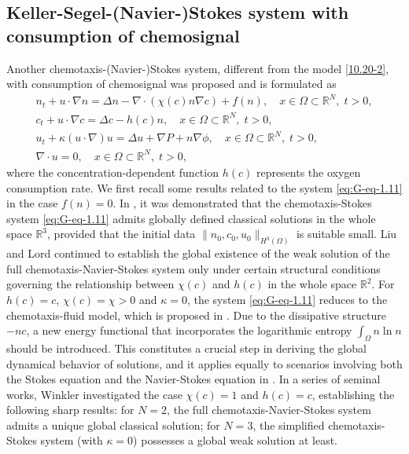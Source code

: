 \documentclass[10pt,a4paper]{amsart}
\numberwithin{equation}{section}
\begin{document}
\subsection*{Keller-Segel-(Navier-)Stokes system with consumption of chemosignal} 
Another chemotaxis-(Navier-)Stokes system, different from the model \eqref{10.20-2}, 
with consumption of chemosignal was proposed and is formulated as 
\begin{equation}\label{eq:G-eq-1.11}
\begin{gathered}
n_t + u \cdot \nabla n = \Delta n -\nabla \cdot ( \chi(c) n \nabla c) + f(n), \quad
 x \in \Omega\subset \mathbb{R}^N,\; t > 0, \\
c_t + u \cdot \nabla c = \Delta c - h(c) n, \quad
 x \in \Omega\subset \mathbb{R}^N,\; t > 0, \\
u_t + \kappa ( u \cdot \nabla ) u = \Delta u + \nabla P + n \nabla \phi, \quad
 x \in \Omega\subset \mathbb{R}^N,\; t > 0, \\
\nabla \cdot u = 0, \quad x \in \Omega\subset \mathbb{R}^N,\; t > 0,
\end{gathered}
\end{equation}
where the concentration-dependent function $h(c)$ represents the oxygen consumption 
rate. We first recall some results related to the system \eqref{eq:G-eq-1.11} 
in the case $f(n)=0$. In \cite{G-8}, it was demonstrated that the
chemotaxis-Stokes system \eqref{eq:G-eq-1.11} admits globally defined classical 
solutions in the whole space $\mathbb{R}^3$, provided that the initial data 
$\|n_0, c_0, u_0\|_{H^3(\Omega)}$ is suitable small. Liu and Lord
\cite{s1468-17} continued to establish the global existence of the weak solution of 
the full chemotaxis-Navier-Stokes system only under
certain structural conditions governing the relationship between $\chi(c)$ and 
$h(c)$ in the whole space $\mathbb{R}^2$. For $ h(c) = c $, $ \chi(c) = \chi >0 $ and 
$ \kappa = 0 $, the system \eqref{eq:G-eq-1.11} reduces to the chemotaxis-fluid model,
which is proposed in \cite{Tuval-2005}. Due to the dissipative structure $-nc$, 
a new energy functional that incorporates the logarithmic entropy $\int_\Omega
n \ln n$ should be introduced. This constitutes a crucial step in deriving the 
global dynamical behavior of solutions, and it applies equally to
scenarios involving both the Stokes equation and the Navier-Stokes equation 
in \cite{W2020-28,W2020-29,W2020-30,W2020-31}.
In a series of seminal works, Winkler investigated the case $\chi(c) = 1 $ and 
$ h(c) = c $, establishing the following sharp results: for $N=2$, the full 
chemotaxis-Navier-Stokes system admits a unique global classical solution; 
for $N=3$, the simplified chemotaxis-Stokes system (with $\kappa=0 $)
possesses a global weak solution at least.
\end{document}
